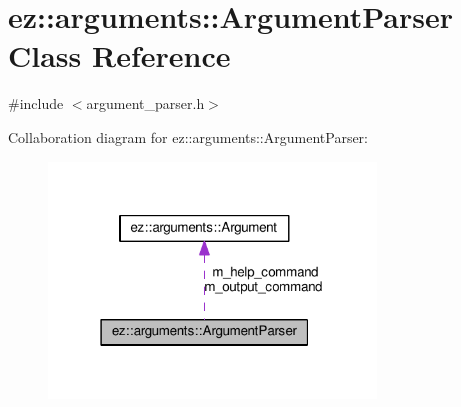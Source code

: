\hypertarget{classez_1_1arguments_1_1ArgumentParser}{}\section{ez\+:\+:arguments\+:\+:Argument\+Parser Class Reference}
\label{classez_1_1arguments_1_1ArgumentParser}


{\ttfamily \#include $<$argument\+\_\+parser.\+h$>$}



Collaboration diagram for ez\+:\+:arguments\+:\+:Argument\+Parser\+:
\nopagebreak
\begin{figure}[H]
\begin{center}
\leavevmode
\includegraphics[width=247pt]{classez_1_1arguments_1_1ArgumentParser__coll__graph}
\end{center}
\end{figure}
